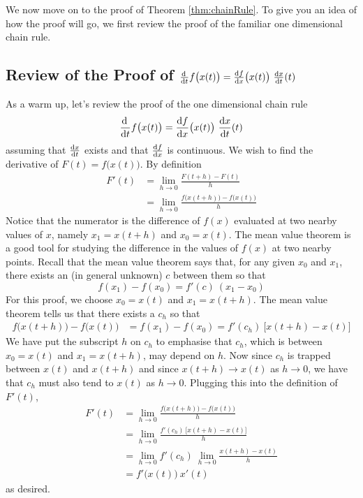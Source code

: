 We now move on to the proof of Theorem \ref{thm:chainRule}.
To give you an idea of how the proof will go, we first review
the proof of the familiar one dimensional chain rule. 

\subsection{Review of the Proof of 
     $\diff{}{t}f\big(x(t)\big)  = \diff{f}{x}\big(x(t)\big)\ \diff{x}{t}(t)$}
\label{subsec 1d chain rule}


As a warm up, let's review the proof of the one dimensional chain rule
\begin{equation*}
    \diff{}{t}f\big(x(t)\big) = \diff{f}{x}\big(x(t)\big)\ \diff{x}{t}(t)
\end{equation*}
assuming that $\diff{x}{t}$ exists and that $\diff{f}{x}$ is continuous.
We wish to find the derivative of $F(t) = f\big(x(t)\big)$.
By definition
\begin{align*}
F'(t) &= \lim_{h\rightarrow 0}\frac{F(t+h)-F(t)}{h} \\
      &= \lim_{h\rightarrow 0}\frac{f\big(x(t+h)\big)-f\big(x(t)\big)}{h}
\end{align*}
Notice that the numerator is the difference of $f(x)$ evaluated at two nearby
values of $x$, namely $x_1=x(t+h)$ and $x_0=x(t)$. The mean value theorem is
a good tool for studying the difference in the values of $f(x)$ at two
nearby points. Recall that the mean value theorem says that, for any 
given $x_0$ and  $x_1$, there exists an (in general unknown) $c$ between 
them so that
\begin{equation*}
f(x_1) - f(x_0) = f'(c)\ (x_1-x_0)
\end{equation*}
For this proof, we choose $x_0=x(t)$ and $x_1=x(t+h)$. The mean value theorem tells us that there exists a $c_h$ so that
\begin{align*}
f\big(x(t+h)\big)-f\big(x(t)\big)
&= f(x_1)-f(x_0)
 = f'(c_h)\ \big[x(t+h)-x(t)\big]
\end{align*}
We have put the subscript $h$ on $c_h$ to emphasise that
$c_h$, which is between $x_0=x(t)$ and $x_1=x(t+h)$, may depend on $h$.
Now since  $c_h$ is trapped between $x(t)$ and $x(t+h)$ and since
$x(t+h)\rightarrow x(t)$ as $h\rightarrow 0$, we have that $c_h$ must 
also tend to $x(t)$ as $h\rightarrow 0$. Plugging this into the definition of $F'(t)$,
\begin{align*}
F'(t)  &= \lim_{h\rightarrow 0}\frac{f\big(x(t+h)\big)-f\big(x(t)\big)}{h} \\
&= \lim_{h\rightarrow 0}\frac{f'(c_h)\ \big[x(t+h)-x(t)\big]}{h} \\
&= \lim_{h\rightarrow 0}f'(c_h)\ 
    \lim_{h\rightarrow 0}\frac{x(t+h)-x(t)}{h} \\
&= f'\big(x(t)\big)\ x'(t)
\end{align*}
as desired.

